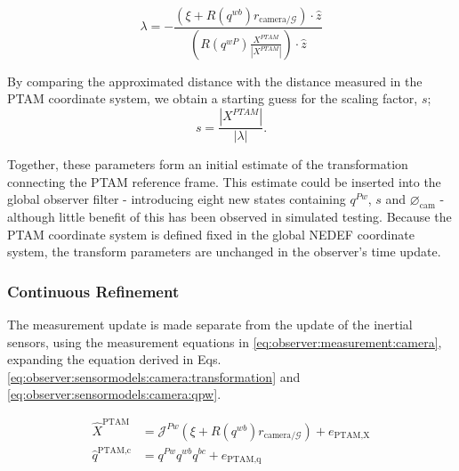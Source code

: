         \begin{equation}
            \label{eq:observer:sensormodels:camera:lambda}
            \lambda = -\frac{\left(\xi + R(q^{wb}) r_{\text{camera}/\mathcal{G}} \right) \cdot \hat{z}}{\left( R(q^{wP}) \frac{X^{PTAM}}{|X^{PTAM}|} \right) \cdot \hat{z}}
        \end{equation}


        By comparing the approximated distance with the distance measured
        in the PTAM coordinate system, we obtain a starting guess for the scaling factor, $s$;
        \begin{equation}
            s = \frac{|X^{PTAM}|}{|\lambda|}.
        \end{equation}

        Together, these parameters form an initial estimate of the transformation
        connecting the PTAM reference frame. This estimate could be inserted into
        the global observer filter - introducing eight new states containing
        $q^{Pw}$, $s$ and $\varnothing_{\text{cam}}$ - although little benefit
        of this has been observed in simulated testing.
        Because the PTAM coordinate system is defined fixed in the global NEDEF coordinate system,
        the transform parameters are unchanged in the observer's time update.

    \subsubsection{Continuous Refinement}
        \label{sssec:observer:sensormodels:camera:refinement}
        The measurement update is made separate from the update of the inertial sensors, using
        the measurement equations in \eqref{eq:observer:measurement:camera}, expanding the
        equation derived in Eqs. \eqref{eq:observer:sensormodels:camera:transformation} and \eqref{eq:observer:sensormodels:camera:qpw}.

        \begin{subequations}
            \label{eq:observer:measurement:camera}
            \begin{align}
                \hat{X}^{\text{PTAM}} &= \mathcal{J}^{Pw} (\xi + R(q^{wb})r_{\text{camera}/\mathcal{G}}) + e_{\text{PTAM,X}} \\
                \hat{q}^{\text{PTAM,c}} &= q^{Pw} q^{wb} q^{bc} + e_{\text{PTAM,q}}
            \end{align}
        \end{subequations}

